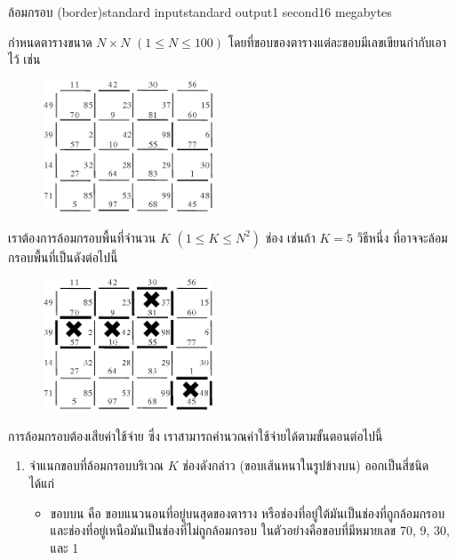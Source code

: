 \documentclass[11pt,a4paper]{article}
\begin{document}
\begin{problem}{ล้อมกรอบ (border)}{standard input}{standard output}{1 second}{16 megabytes}

    กำหนดตารางขนาด $N \times N$ $(1 \leq N \leq 100)$ โดยที่ขอบของตารางแต่ละขอบมีเลขเขียนกำกับเอาไว้ เช่น

\begin{figure}[h!]
\centering
\includegraphics[width=0.45\textwidth]{../latex/img/1068/1068-1.png}
\end{figure}



    เราต้องการล้อมกรอบพื้นที่จำนวน $K$ $(1 \leq K \leq N^2)$ ช่อง เช่นถ้า $K = 5$ วิธีหนึ่ง ที่อาจจะล้อมกรอบพื้นที่เป็นดังต่อไปนี้
 
\begin{figure}[h!]
\centering
\includegraphics[width=0.45\textwidth]{../latex/img/1068/1068-2.png}
\end{figure}



    การล้อมกรอบต้องเสียค่าใช้จ่าย ซึ่ง เราสามารถคำนวณค่าใช้จ่ายได้ตามขั้นตอนต่อไปนี้
 
\begin{enumerate}

\item จำแนกขอบที่ล้อมกรอบบริเวณ $K$ ช่องดังกล่าว (ขอบเส้นหนาในรูปข้างบน) ออกเป็นสี่ชนิด ได้แก่
\begin{itemize}
\item ขอบบน คือ ขอบแนวนอนที่อยู่บนสุดของตาราง หรือช่องที่อยู่ใต้มันเป็นช่องที่ถูกล้อมกรอบ และช่องที่อยู่เหนือมันเป็นช่องที่ไม่ถูกล้อมกรอบ ในตัวอย่างคือขอบที่มีหมายเลข 70, 9, 30, และ 1


\end{itemize}
\end{enumerate}
\end{problem}
\end{document}
